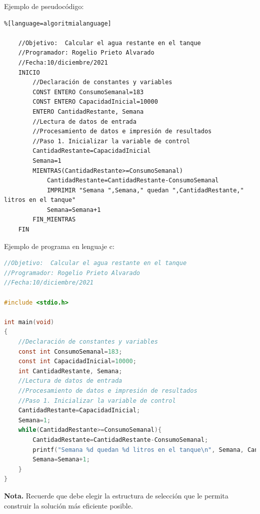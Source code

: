 \documentclass[spanish,11pt,twoside]{article}
\newcommand{\rocketbox}[1]{
	\awesomebox[uasblue]{2pt}{\faRocket}{uasblue}{#1}
}
\begin{document}
\vspace{120px}
\newpage
Ejemplo de pseudocódigo:
\begin{lstlisting}%[language=algoritmialanguage]
	
	//Objetivo:  Calcular el agua restante en el tanque 
	//Programador: Rogelio Prieto Alvarado
	//Fecha:10/diciembre/2021
	INICIO
		//Declaración de constantes y variables
		CONST ENTERO ConsumoSemanal=183
		CONST ENTERO CapacidadInicial=10000
		ENTERO CantidadRestante, Semana
		//Lectura de datos de entrada
		//Procesamiento de datos e impresión de resultados
		//Paso 1. Inicializar la variable de control
		CantidadRestante=CapacidadInicial
		Semana=1
		MIENTRAS(CantidadRestante>=ConsumoSemanal)
			CantidadRestante=CantidadRestante-ConsumoSemanal
			IMPRIMIR "Semana ",Semana," quedan ",CantidadRestante," litros en el tanque"
			Semana=Semana+1
		FIN_MIENTRAS
	FIN
\end{lstlisting}


Ejemplo de programa en lenguaje c:
\begin{lstlisting}[language=C]
//Objetivo:  Calcular el agua restante en el tanque 
//Programador: Rogelio Prieto Alvarado
//Fecha:10/diciembre/2021
	
#include <stdio.h>

int main(void)
{
	//Declaración de constantes y variables
	const int ConsumoSemanal=183;
	const int CapacidadInicial=10000;
	int CantidadRestante, Semana;
	//Lectura de datos de entrada
	//Procesamiento de datos e impresión de resultados
	//Paso 1. Inicializar la variable de control
	CantidadRestante=CapacidadInicial;
	Semana=1;
	while(CantidadRestante>=ConsumoSemanal){
		CantidadRestante=CantidadRestante-ConsumoSemanal;
		printf("Semana %d quedan %d litros en el tanque\n", Semana, CantidadRestante);
		Semana=Semana+1;
	}
}
\end{lstlisting}



\begin{noteblock} %
	\textcolor{uasblue}{\textbf{\textsf{Nota.}}} Recuerde que debe elegir la estructura de selección que le permita construir la solución más eficiente posible. 
	
\end{noteblock}


\end{document}
